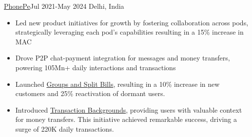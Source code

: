 \documentclass[10pt,a4paper,ragged2e]{altacv}
\begin{document}
 {\color{mecol}\href{https://www.phonepe.com/}{PhonePe}}{Jul 2021-May 2024 }{Delhi, India}
\begin{itemize}


\item {Led new product initiatives for growth by fostering collaboration across pods, strategically leveraging each pod's capabilities resulting in a 15\% increase in MAC}
\item {Drove P2P chat-payment integration for messages and money transfers, powering 105Mn+ daily interactions and transactions }
\item {Launched \href{https://www.phonepe.com/blog/design/phonepes-split-expenses-streamlining-group-transactions-with-ease/}{Groups and Split Bills}, resulting in a 10\% increase in new customers and 25\% reactivation of dormant users.  }
\item { Introduced \href{https://www.instagram.com/s/aGlnaGxpZ2h0OjE3OTA3NTEwMjY4NzE2NDQ5?story_media_id=2931443902160263738&igsh=ejYyejBzODgxeXll}{Transaction Backgrounds}, providing users with valuable context for money transfers. This initiative achieved remarkable success, driving a surge of 220K daily transactions. }




\end{itemize}
\divider
\end{document}
